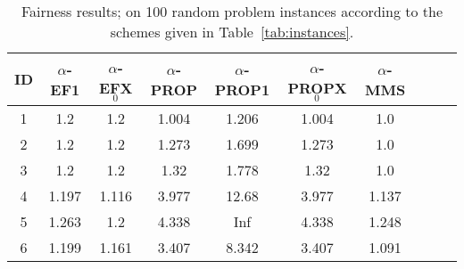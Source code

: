 \begin{table}
  \centering
    \begin{tabular}{cccccccccc}
\toprule
ID & $\alpha$-EF1 & $\alpha$-EFX$_0$ & $\alpha$-PROP & $\alpha$-PROP1 & $\alpha$-PROPX$_0$ & $\alpha$-MMS \\
\midrule
1 & 1.2     & 1.2   & 1.004 & 1.206 & 1.004 & 1.0\\
2 & 1.2     & 1.2   & 1.273 & 1.699 & 1.273 & 1.0\\
3 & 1.2     & 1.2   & 1.32  & 1.778 & 1.32  & 1.0\\
4 & 1.197   & 1.116 & 3.977 & 12.68 & 3.977 & 1.137\\
5 & 1.263   & 1.2   & 4.338 & Inf   & 4.338 & 1.248\\
6 & 1.199   & 1.161 & 3.407 & 8.342 & 3.407 & 1.091\\
\bottomrule
    \end{tabular}
  \caption{Fairness results;  on 100 random problem instances according to the schemes given in Table~\ref{tab:instances}.}
  \label{res:yankeeswap}
\end{table}
